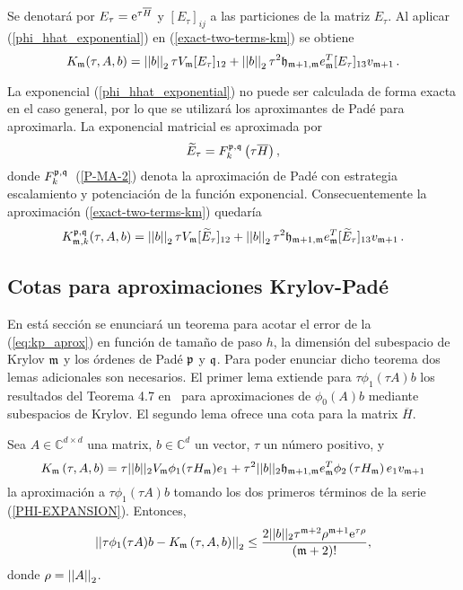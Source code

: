 Se denotará por $E_\tau = \mathrm{e}^{\tau \overline{H} }$ y $[E_\tau]_{ij}$ a las particiones de la matriz $E_\tau$. Al aplicar (\ref{phi_hhat_exponential}) en (\ref{exact-two-terms-km}) se obtiene
\begin{equation*}
    K_{\mathfrak{m}}(\tau,A,b) = \left\lvert \left\lvert  b  \right\rvert \right\rvert_2\tau V_{\mathfrak{m}} [E_\tau]_{12} + \left\lvert \left\lvert  b  \right\rvert \right\rvert_2\tau^2\mathfrak{h}_{\mathfrak{m}+1,\mathfrak{m}}e^T_{\mathfrak{m}}[E_\tau]_{13}v_{\mathfrak{m}+1} \, .
 \end{equation*}

La exponencial (\ref{phi_hhat_exponential}) no puede ser calculada de forma exacta en el caso general, por lo que se utilizará los aproximantes de Padé para aproximarla. La exponencial matricial es aproximada por
\begin{equation*}
    \widetilde{E}_{\tau} = F_k^{\mathfrak{p},\mathfrak{q}}\left(\tau\overline{H}\right),
\end{equation*}
donde $F_k^{\mathfrak{p},\mathfrak{q}}$~(\ref{P-MA-2}) denota la aproximación de Padé con estrategia escalamiento y potenciación de la función exponencial. Consecuentemente la aproximación (\ref{exact-two-terms-km}) quedaría
\begin{equation} \label{eq:kp_aprox}
    K_{\mathfrak{m},k}^{\mathfrak{p},\mathfrak{q}}(\tau,A,b) = \left\lvert \left\lvert  b  \right\rvert \right\rvert_2\tau V_{\mathfrak{m}} [\widetilde{E}_\tau]_{12} + \left\lvert \left\lvert  b  \right\rvert \right\rvert_2\tau^2\mathfrak{h}_{\mathfrak{m}+1,\mathfrak{m}}e^T_{\mathfrak{m}}[\widetilde{E}_\tau]_{13}v_{\mathfrak{m}+1} \, .
 \end{equation}

 \subsection{Cotas para aproximaciones Krylov-Padé}
 En está sección se enunciará un teorema para acotar el error de la (\ref{eq:kp_aprox}) en función de tamaño de paso $h$, la dimensión del subespacio de Krylov $\mathfrak{m}$ y los órdenes de Padé $\mathfrak{p}$ y $\mathfrak{q}$. Para poder enunciar dicho teorema dos lemas adicionales son necesarios. El primer lema extiende para $\tau \phi_1(\tau A)b$ los resultados del Teorema 4.7 en~\cite{Saad92} para aproximaciones de $\phi_0(A)b$ mediante subespacios de Krylov. El segundo lema ofrece una cota para la matrix $\overline{H}$.

 \begin{lemma}\cite{naranjo2021locally}\label{lemma:CORRECTED-ERROR}
	Sea $A\in\mathbb{C}^{d\times d}$ una matrix, $b\in\mathbb{C}^{d}$ un vector, $\tau$ un número positivo, y \[{K_{\mathfrak{m}}\left(\tau,A , b \right) = \tau ||b||_2 V_{\mathfrak{m}} \phi_1(\tau H_{\mathfrak{m}})e_1}+\tau^2 ||b||_2 \mathfrak{h}_{\mathfrak{m}+1,\mathfrak{m}}e_{\mathfrak{m}}^T\phi_2\left(\tau H_{\mathfrak{m}}\right) e_1 v_{\mathfrak{m}+1} \] la aproximación a $\tau \phi_1(\tau A)b$ tomando los dos primeros términos de la serie (\ref{PHI-EXPANSION}). Entonces,
	\begin{gather*}
	\left\lvert\left\lvert \tau\phi_1(\tau A)b - K_{\mf}\left(\tau,A , b \right) \right\rvert\right\rvert_2%
	\leq \frac{2\vert\lvert b \rvert\rvert_2\tau^{\mf+2}\rho^{\mf+1}\me{\tau \rho}}{(\mf+2)!},
	\end{gather*}
	donde $\rho=\left\lvert \left\lvert A \right\rvert \right\rvert_2$.
\end{lemma}

